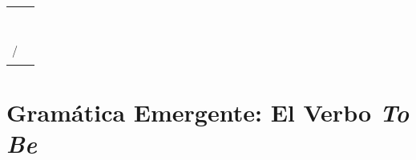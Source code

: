 \documentclass[12pt,a4paper]{article}
\begin{document}
\begin{cajachunk}
\begin{tabularx}{\textwidth}{@{} X l @{}}
\eng{I don't understand.} & \esp{No entiendo.} \\
\eng{Can you repeat, please?} & \esp{¿Puedes repetir, por favor?} \\
\eng{What does \underline{\hspace{2cm}} mean?} & \esp{¿Qué significa \underline{\hspace{2cm}}?} \\
\eng{How do you say \underline{\hspace{2cm}}?} & \esp{¿Cómo se dice \underline{\hspace{2cm}}?} \\
\eng{Slowly, please.} & \esp{Despacio, por favor.} \\
\eng{One more time, please.} & \esp{Una vez más, por favor.} \\
\eng{Yes. / No.} & \esp{Sí. / No.} \\
\eng{Thank you. / Thanks!} & \esp{Gracias.} \\
\eng{Sorry.} / \eng{Excuse me.} & \esp{Perdón. / Disculpa.} \\
\eng{I have a question.} & \esp{Tengo una pregunta.} \\
\end{tabularx}
\end{cajachunk}

\section{Gramática Emergente: El Verbo \textit{To Be}}
\end{document}
